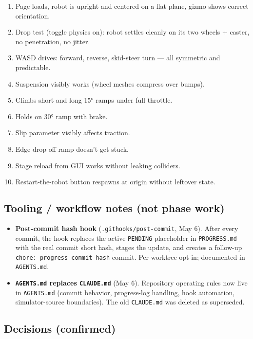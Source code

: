 \documentclass[
]{article}
\providecommand{\tightlist}{%
  \setlength{\itemsep}{0pt}\setlength{\parskip}{0pt}}
\begin{document}
\begin{enumerate}
\def\labelenumi{\arabic{enumi}.}
\tightlist
\item
  Page loads, robot is upright and centered on a flat plane, gizmo shows
  correct orientation.
\item
  Drop test (toggle physics on): robot settles cleanly on its two wheels
  + caster, no penetration, no jitter.
\item
  WASD drives: forward, reverse, skid-steer turn --- all symmetric and
  predictable.
\item
  Suspension visibly works (wheel meshes compress over bumps).
\item
  Climbs short and long 15° ramps under full throttle.
\item
  Holds on 30° ramp with brake.
\item
  Slip parameter visibly affects traction.
\item
  Edge drop off ramp doesn't get stuck.
\item
  Stage reload from GUI works without leaking colliders.
\item
  Restart-the-robot button respawns at origin without leftover state.
\end{enumerate}

\subsection{Tooling / workflow notes (not phase
work)}\label{tooling-workflow-notes-not-phase-work}

\begin{itemize}
\tightlist
\item
  \textbf{Post-commit hash hook} (\texttt{.githooks/post-commit}, May
  6). After every commit, the hook replaces the active \texttt{PENDING}
  placeholder in \texttt{PROGRESS.md} with the real commit short hash,
  stages the update, and creates a follow-up
  \texttt{chore:\ progress\ commit\ hash} commit. Per-worktree opt-in;
  documented in \texttt{AGENTS.md}.
\item
  \textbf{\texttt{AGENTS.md} replaces \texttt{CLAUDE.md}} (May 6).
  Repository operating rules now live in \texttt{AGENTS.md} (commit
  behavior, progress-log handling, hook automation, simulator-source
  boundaries). The old \texttt{CLAUDE.md} was deleted as superseded.
\end{itemize}

\subsection{Decisions (confirmed)}\label{decisions-confirmed}
\end{document}
